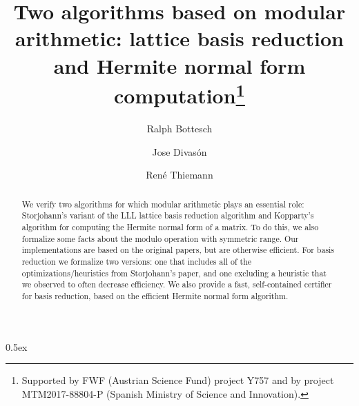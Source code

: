 \documentclass[11pt,a4paper]{article}
\begin{document}
\title{Two algorithms based on modular arithmetic: lattice basis reduction and Hermite normal form computation\footnote{Supported
by FWF (Austrian Science Fund) project Y757 
and by project MTM2017-88804-P (Spanish Ministry of Science and Innovation).}}
\author{Ralph Bottesch \and Jose Divas\'on \and Ren\'e Thiemann}
\maketitle

\begin{abstract}
We verify two algorithms for which modular arithmetic plays an essential role: Storjohann's variant of the LLL lattice basis reduction algorithm and Kopparty's algorithm for computing the Hermite normal form of a matrix. To do this, we also formalize some facts about the modulo operation with symmetric range. Our implementations are based on the original papers, but are otherwise efficient. For basis reduction we formalize two versions: one that includes all of the optimizations/heuristics from Storjohann's paper, and one excluding a heuristic that we observed to often decrease efficiency. We also provide a fast, self-contained certifier for basis reduction, based on the efficient Hermite normal form algorithm.
\end{abstract}

\tableofcontents

\parindent 0pt\parskip 0.5ex



%
%
\end{document}
